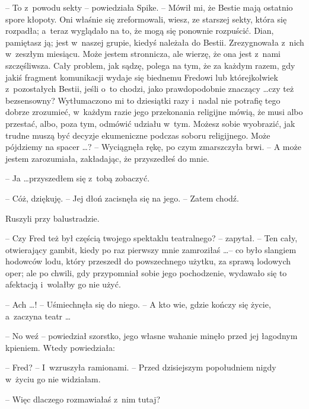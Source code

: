 \documentclass[oneside,polish,11pt,rmheadings]{mwbk}
\begin{document}
-- To z~powodu sekty -- powiedziała Spike. -- Mówił mi, że Bestie mają ostatnio spore kłopoty. Oni właśnie się zreformowali, wiesz, ze starszej sekty, która się rozpadła; a~teraz wyglądało na to, że mogą się ponownie rozpuścić. Dian, pamiętasz ją; jest w~naszej grupie, kiedyś należała do Bestii. Zrezygnowała z~nich w~zeszłym miesiącu. Może jestem stronnicza, ale wierzę, że ona jest z~nami szczęśliwsza. Cały problem, jak sądzę, polega na tym, że za każdym razem, gdy jakiś fragment komunikacji wydaje się biednemu Fredowi lub którejkolwiek z~pozostałych Bestii, jeśli o~to chodzi, jako prawdopodobnie znaczący \ldots  czy też bezsensowny? Wytłumaczono mi to dziesiątki razy i~nadal nie potrafię tego dobrze zrozumieć, w~każdym razie jego przekonania religijne mówią, że musi albo przestać, albo, poza tym, odmówić udziału w~tym. Możesz sobie wyobrazić, jak trudne muszą być decyzje ekumeniczne podczas soboru religijnego. Może pójdziemy na spacer \ldots ? -- Wyciągnęła rękę, po czym zmarszczyła brwi. -- A może jestem zarozumiała, zakładając, że przyszedłeś do mnie.  

-- Ja \ldots  przyszedłem się z~tobą zobaczyć.  

-- Cóż, dziękuję. -- Jej dłoń zacisnęła się na jego. -- Zatem chodź. 

Ruszyli przy balustradzie. 

-- Czy Fred też był częścią twojego spektaklu teatralnego? -- zapytał. -- Ten cały, otwierający gambit, kiedy po raz pierwszy mnie zamroziłaś \ldots  -- co było slangiem hodowców lodu, który przeszedł do powszechnego użytku, za sprawą lodowych oper; ale po chwili, gdy przypomniał sobie jego pochodzenie, wydawało się to afektacją i~wolałby go nie użyć. 

-- Ach  \ldots ! -- Uśmiechnęła się do niego. -- A kto wie, gdzie kończy się życie, a~zaczyna teatr \ldots  

-- No weź -- powiedział szorstko, jego własne wahanie minęło przed jej łagodnym kpieniem. Wtedy powiedziała:  

-- Fred? -- I~wzruszyła ramionami. -- Przed dzisiejszym popołudniem nigdy w~życiu go nie widziałam. 

-- Więc dlaczego rozmawiałaś z~nim tutaj? 
\end{document}
